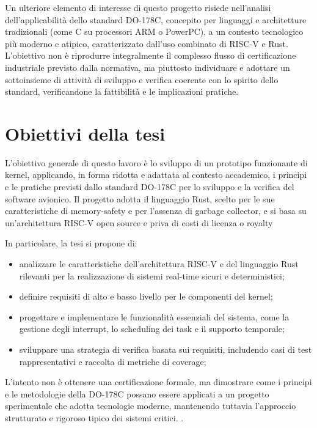 \documentclass[italian, Lau, oneside]{sapthesis} %
\begin{document}
\bigskip
Un ulteriore elemento di interesse di questo progetto risiede nell’analisi dell’applicabilità dello standard DO-178C, concepito per linguaggi e architetture tradizionali (come C su processori ARM o PowerPC), a un contesto tecnologico più moderno e atipico, caratterizzato dall’uso combinato di RISC-V e Rust.  
L’obiettivo non è riprodurre integralmente il complesso flusso di certificazione industriale previsto dalla normativa, ma piuttosto individuare e adottare un sottoinsieme di attività di sviluppo e verifica coerente con lo spirito dello standard, verificandone la fattibilità e le implicazioni pratiche.

\newpage
\section{Obiettivi della tesi}
L’obiettivo generale di questo lavoro è lo sviluppo di un prototipo funzionante di kernel, applicando, in forma ridotta e adattata al contesto accademico, i principi e le pratiche previsti dallo standard DO-178C per lo sviluppo e la verifica del software avionico. Il progetto adotta il linguaggio Rust, scelto per le sue caratteristiche di memory-safety e per l’assenza di garbage collector, e si basa su un’architettura RISC-V open source e priva di costi di licenza o royalty

In particolare, la tesi si propone di:
\begin{itemize}
    \item analizzare le caratteristiche dell’architettura RISC-V e del linguaggio Rust rilevanti per la realizzazione di sistemi real-time sicuri e deterministici;
    \item definire requisiti di alto e basso livello per le componenti del kernel;
    \item progettare e implementare le funzionalità essenziali del sistema, come la gestione degli interrupt, lo scheduling dei task e il supporto temporale;
    \item sviluppare una strategia di verifica basata sui requisiti, includendo casi di test rappresentativi e raccolta di metriche di coverage;
\end{itemize}

L’intento non è ottenere una certificazione formale, ma dimostrare come i principi e le metodologie della DO-178C possano essere applicati a un progetto sperimentale che adotta tecnologie moderne, mantenendo tuttavia l’approccio strutturato e rigoroso tipico dei sistemi critici.
.
\end{document}
